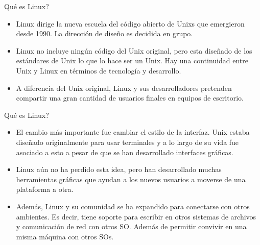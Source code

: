 \documentclass[11pt]{beamer}
\begin{document}
		\begin{frame}{Qué es Linux?}
			\begin{itemize}
				\item Linux dirige la nueva escuela del código abierto de Unixs que emergieron desde 1990. La dirección de diseño es decidida en grupo.
				\item Linux no incluye ningún código del Unix original, pero esta diseñado de los estándares de Unix lo que lo hace ser un Unix. Hay una continuidad entre Unix y Linux en términos de tecnología y desarrollo.
				\item A diferencia del Unix original, Linux y sus desarrolladores pretenden compartir una gran cantidad de usuarios finales en equipos de escritorio. 
			\end{itemize}
		\end{frame}
		\begin{frame}{Qué es Linux?}
			\begin{itemize}
				\item El cambio más importante fue cambiar el estilo de la interfaz. Unix estaba diseñado originalmente para usar terminales y a lo largo de su vida fue asociado a esto a pesar de que se han desarrollado interfaces gráficas.
				\item Linux aún no ha perdido esta idea, pero han desarrollado muchas herramientas gráficas que ayudan a los nuevos usuarios a moverse de una plataforma a otra.
				\item Además, Linux y su comunidad se ha expandido para conectarse con otros ambientes. Es decir, tiene soporte para escribir en otros sistemas de archivos y comunicación de red con otros SO. Además de permitir convivir en una misma máquina con otros SOs.
			\end{itemize}
		\end{frame}
\end{document}
